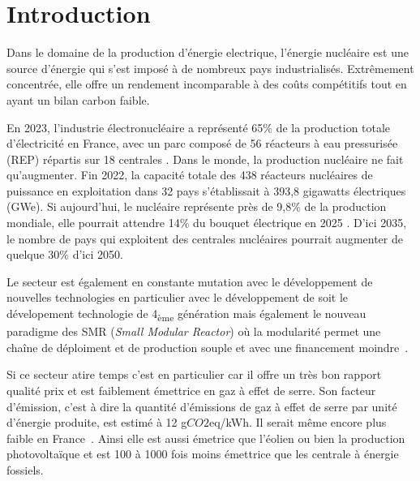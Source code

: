 \chapter{Introduction}

Dans le domaine de la production d'énergie electrique, l'énergie nucléaire est une source d'énergie qui s'est imposé à de nombreux pays industrialisés. Extrêmement concentrée, elle offre un rendement incomparable à des coûts compétitifs tout en ayant un bilan carbon faible.

En 2023, l'industrie électronucléaire a représenté 65\% de la production totale d'électricité en France, avec un parc composé de 56 réacteurs à eau pressurisée (REP) répartis sur 18 centrales \cite{rte2023}. Dans le monde, la production nucléaire ne fait qu'augmenter. Fin 2022, la capacité totale des 438 réacteurs nucléaires de puissance en exploitation dans 32 pays s’établissait à 393,8 gigawatts électriques (GWe). Si aujourd'hui, le nucléaire représente près de 9,8\% de la production mondiale, elle pourrait attendre 14\% du bouquet électrique en 2025 \cite{aiea2023}. D'ici 2035, le nombre de pays qui exploitent des centrales nucléaires pourrait augmenter de quelque 30\% d'ici 2050.

Le secteur est également en constante mutation avec le développement de nouvelles technologies en particulier avec le développement de soit le dévelopement technologie de 4\textsubscript{ème} génération mais également le nouveau paradigme des SMR (\textit{Small Modular Reactor}) où la modularité permet une chaîne de déploiment et de production souple et avec une financement moindre~\cite{academie2022}.

Si ce secteur atire temps c'est en particulier car il offre un très bon rapport qualité prix et est faiblement émettrice en gaz à effet de serre. Son facteur d'émission, c'est à dire la quantité d'émissions de gaz à effet de serre par unité d'énergie produite, est estimé à 12 g$CO2$eq/kWh. Il serait même encore plus faible en France~\cite{schlomer_technology-specific_nodate}. Ainsi elle est aussi émetrice que l'éolien ou bien la production photovoltaïque et est 100 à 1000 fois moins émettrice que les centrale à énergie fossiels.

